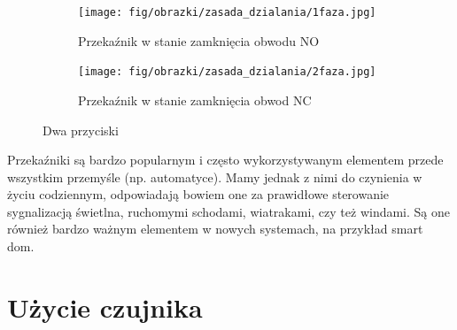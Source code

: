 \documentclass[11pt, a4paper]{article}
\begin{document}
\vspace{0.5cm}
\begin{figure}[h]
\centering
\begin{subfigure}{.5\textwidth}
  \centering
  \texttt{[image: fig/obrazki/zasada\_dzialania/1faza.jpg]}
  \caption{Przekaźnik w stanie zamknięcia obwodu NO}
  \label{fig:sub1}
\end{subfigure}%
\begin{subfigure}{.5\textwidth}
  \centering
  \texttt{[image: fig/obrazki/zasada\_dzialania/2faza.jpg]}
  \caption{Przekaźnik w stanie zamknięcia obwod NC}
  \label{fig:sub2}
\end{subfigure}
\caption{Dwa przyciski}
\label{fig:test}
\end{figure}
\vspace{0.5cm}

Przekaźniki są bardzo popularnym i często wykorzystywanym elementem przede wszystkim przemyśle (np. automatyce).
Mamy jednak z nimi do czynienia w życiu codziennym, odpowiadają bowiem one za prawidłowe sterowanie sygnalizacją świetlna, ruchomymi schodami, wiatrakami, czy też windami. Są one również bardzo ważnym elementem w nowych systemach, na przykład smart dom.


\newpage






\newpage

\section{Użycie czujnika}
\end{document}
